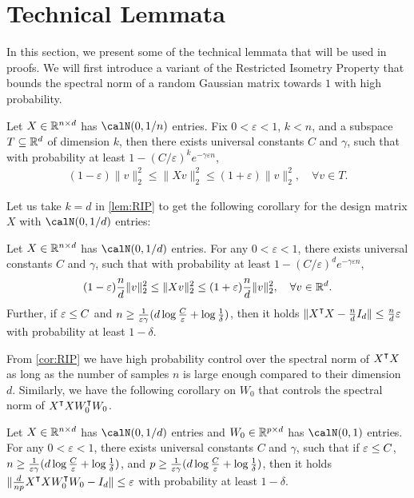 \section{Technical Lemmata}

In this section, we present some of the technical lemmata that will be used in proofs.
We will first introduce a variant of the Restricted Isometry Property that bounds the spectral norm of a random Gaussian matrix towards $1$ with high probability.

\begin{lemma}\label{lem:RIP}
    Let $X\in {\mathbb{R}^{n\times d}}$ has \iid $\calN(0,1/n)$ entries. Fix $0<\varepsilon<1$, $k < n$, and a subspace $T\subseteq \mathbb{R}^d$ of dimension $k$, then there exists universal constants $C$ and $\gamma$, such that with probability at least $1-(C/\varepsilon)^k e^{-\gamma\varepsilon n}$,
    \begin{align*}
    (1-\varepsilon)\|v\|^2_2 \leq \|Xv\|^2_2 \leq (1+\varepsilon)\|v\|^2_2, \quad \forall v\in T.
    \end{align*}
\end{lemma}
Let us take $k = d$ in \cref{lem:RIP} to get the following corollary for the design matrix $X$ with \iid $\calN(0,1/d)$ entries:
\begin{corollary}\label{cor:RIP}
    Let $X\in {\mathbb{R}^{n\times d}}$ has \iid $\calN(0,1/d)$ entries. For any $0<\varepsilon<1$, there exists universal constants $C$ and $\gamma$, such that with probability at least $1-(C/\varepsilon)^d e^{-\gamma\varepsilon n}$,
    \begin{align*}
        (1-\varepsilon)\frac{n}{d}\|v\|^2_2 \leq \|Xv\|^2_2 \leq (1+\varepsilon)\frac{n}{d}\|v\|^2_2, \quad \forall v\in{\mathbb{R}^{d}}.
    \end{align*}
    Further, if $\varepsilon \leq C$ and $n \geq \frac{1}{\varepsilon\gamma} (d\log\frac{C}{\varepsilon} + \log\frac{1}{\delta})$, then it holds $\|X\transpose X - \frac{n}{d} I_d\| \leq \frac{n}{d}\varepsilon$ with probability at least $1-\delta$.
\end{corollary}
From \cref{cor:RIP} we have high probability control over the spectral norm of $X\transpose X$ as long as the number of samples $n$ is large enough compared to their dimension $d$.
Similarly, we have the following corollary on $W_0$ that controls the spectral norm of $X\transpose XW_0\transpose W_0$.

\begin{corollary}\label{cor:W0-tail}
    Let $X\in {\mathbb{R}^{n\times d}}$ has \iid $\calN(0,1/d)$ entries and $W_0\in {\mathbb{R}^{p\times d}}$ has \iid $\calN(0,1)$ entries. For any $0<\varepsilon<1$, there exists universal constants $C$ and $\gamma$, such that if $\varepsilon \leq C$, $n \geq \frac{1}{\varepsilon\gamma} (d\log\frac{C}{\varepsilon} + \log\frac{1}{\delta})$, and $p \geq \frac{1}{\varepsilon\gamma} (d\log\frac{C}{\varepsilon} + \log\frac{1}{\delta})$, then it holds $\|\frac{d}{np}X\transpose XW_0\transpose W_0 - I_d\| \leq \varepsilon$ with probability at least $1-\delta$.
\end{corollary}

